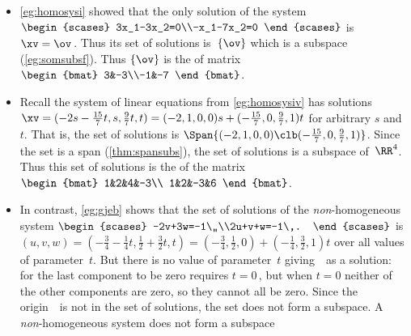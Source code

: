 \begin{example} \label{eg:nullsp}
\begin{itemize}
\item  \cref{eg:homosysi} showed that the only solution of the  system \(\begin{scases}
3x_1-3x_2=0\\-x_1-7x_2=0
\end{scases}\) is \(\xv=\ov\)\,.
Thus its set of solutions is~\(\{\ov\}\) which is a subspace (\cref{eg:somsubsf}).
Thus \(\{\ov\}\) is the  of matrix \(\begin{bmat} 3&-3\\-1&-7 \end{bmat}\).

\item Recall the  system of linear equations from \cref{eg:homosysiv} has solutions \(\xv=(-2s-\frac{15}7t,s,\frac97t,t) =(-2,1,0,0)s+(-\frac{15}7,0,\frac97,1)t\) for arbitrary \(s\) and~\(t\).
That is, the set of solutions is \(\Span\{(-2,1,0,0)\clb (-\frac{15}7,0,\frac97,1)\}\).
Since the set is a span (\cref{thm:spansubs}), the set of solutions is a subspace of~\(\RR^4\).
Thus this set of solutions is the  of the matrix \(\begin{bmat} 1&2&4&-3\\
1&2&-3&6 \end{bmat}\).

\item In contrast, \cref{eg:gjeb} shows that the set of solutions of the \emph{non}-homogeneous system \(\begin{scases}
-2v+3w=-1\,,\\2u+v+w=-1\,.
\end{scases}\)
is \((u,v,w)=(-\frac34-\frac14t,\frac12+\frac32t,t)
=(-\frac34,\frac12,0)+(-\frac14,\frac32,1)t\)
over all values of parameter~\(t\).
But there is no value of parameter~\(t\) giving~\ov\ as a solution: for the last component to be zero requires \(t=0\)\,, but when \(t=0\) neither of the other components are zero, so they cannot all be zero.
Since the origin~\ov\ is not in the set of solutions, the set does not form a subspace. 
A \emph{non}-homogeneous system does not form a subspace 
\end{itemize}
\end{example}



